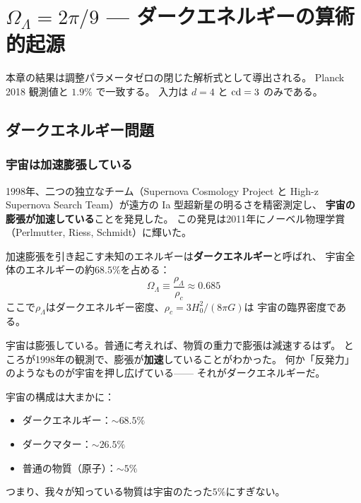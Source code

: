 
\chapter{$\Omega_\Lambda = 2\pi/9$ — ダークエネルギーの算術的起源}
\label{ch:dark-energy}

\begin{statusbox}
本章の結果は調整パラメータゼロの閉じた解析式として導出される。
Planck 2018 観測値と $1.9\%$ で一致する。
入力は $d=4$ と $\operatorname{cd}=3$ のみである。
\end{statusbox}

\section{ダークエネルギー問題}
\label{sec:DE-problem}

\subsection{宇宙は加速膨張している}

1998年、二つの独立なチーム（Supernova Cosmology Project と High-z Supernova
Search Team）が遠方の Ia 型超新星の明るさを精密測定し、
\textbf{宇宙の膨張が加速している}ことを発見した。
この発見は2011年にノーベル物理学賞（Perlmutter, Riess, Schmidt）に輝いた。

加速膨張を引き起こす未知のエネルギーは\textbf{ダークエネルギー}と呼ばれ、
宇宙全体のエネルギーの約$68.5\%$を占める：
\begin{equation}
\Omega_\Lambda \equiv \frac{\rho_\Lambda}{\rho_c} \approx 0.685
\end{equation}
ここで$\rho_\Lambda$はダークエネルギー密度、$\rho_c = 3H_0^2/(8\pi G)$は
宇宙の臨界密度である。

\begin{hsbox}
宇宙は膨張している。普通に考えれば、物質の重力で膨張は減速するはず。
ところが1998年の観測で、膨張が\textbf{加速}していることがわかった。
何か「反発力」のようなものが宇宙を押し広げている——
それがダークエネルギーだ。

宇宙の構成は大まかに：
\begin{itemize}[nosep]
\item ダークエネルギー：$\sim 68.5\%$
\item ダークマター：$\sim 26.5\%$
\item 普通の物質（原子）：$\sim 5\%$
\end{itemize}
つまり、我々が知っている物質は宇宙のたった$5\%$にすぎない。
\end{hsbox}

